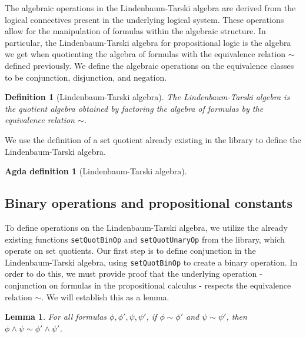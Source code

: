 \documentclass[titlepage]{article}
\newtheorem{definition}{Definition}[section]
\newtheorem{lemma}{Lemma}[section]
\newtheorem{agdadef}{Agda definition}
\begin{document}
The algebraic operations in the Lindenbaum-Tarski algebra are derived from the logical connectives present in the underlying logical system. These operations allow for the manipulation of formulas within the algebraic structure. In particular, the Lindenbaum-Tarski algebra for propositional logic is the algebra we get when quotienting the algebra of formulas with the equivalence relation $\sim$ defined previously. We define the algebraic operations on the equivalence classes to be conjunction, disjunction, and negation.

\begin{definition}[Lindenbaum-Tarski algebra]
    The Lindenbaum-Tarski algebra is the quotient algebra obtained by factoring the algebra of formulas by the equivalence relation $\sim$.
\end{definition}
We use the definition of a set quotient already existing in the \agdaCubical library to define the Lindenbaum-Tarski algebra.

\begin{agdadef}[Lindenbaum-Tarski algebra]$ $
\end{agdadef}



\subsection{Binary operations and propositional constants}

To define operations on the Lindenbaum-Tarski algebra, we utilize the already existing functions \texttt{setQuotBinOp} and \texttt{setQuotUnaryOp} from the \agdaCubical library, which operate on set quotients. Our first step is to define conjunction in the Lindenbaum-Tarski algebra, using \texttt{setQuotBinOp} to create a binary operation. In order to do this, we must provide proof that the underlying operation - conjunction on formulas in the propositional calculus - respects the equivalence relation $\sim$. We will establish this as a lemma.

\begin{lemma}
    For all formulas $\phi,\phi',\psi,\psi'$, if $\phi \sim \phi'$ and $\psi \sim \psi'$, then $\phi \wedge \psi \sim \phi' \wedge \psi'$.
\end{lemma}
\end{document}
